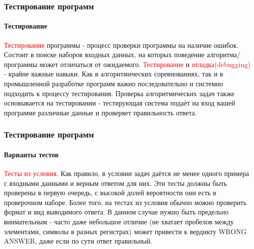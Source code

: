 \documentclass[aspectratio=169]{beamer}
\begin{document}
\begin{frame}
\frametitle{Тестирование программ}
\framesubtitle{Тестирование}
\justifying
\textcolor{red}{Тестирование} программы - процесс проверки программы на наличие ошибок. Состоит в поиске наборов входных данных, на которых поведение алгоритма/программы может отличаться от ожидаемого. \textcolor{red}{Тестирование} и \textcolor{red}{отладка(debugging)} - крайне важные навыки.\newline\newline
Как в алгоритмических соревнованиях, так и в промышленной разработке программ важно последовательно и системно подходить к процессу тестирования.\newline\newline
Проверка алгоритмических задач также основывается на тестировании - тестирующая система подаёт на вход вашей программе различные данные и проверяет правильность ответа.

\end{frame}

\begin{frame}
\frametitle{Тестирование программ}
\framesubtitle{Варианты тестов}
\justifying
\textcolor{red}{Тесты из условия}. Как правило, в условии задач даётся не менее одного примера с входными данными и верным ответом для них. Эти тесты должны быть проверены в первую очередь, с высокой долей вероятности они есть в проверочном наборе. \newline\newline
Более того, на тестах из условия обычно можно проверить формат и вид выводимого ответа. В данном случае нужно быть предельно внимательным - часто даже небольшое отличие (не хватает пробелов между элементами, символы в разных регистрах) может привести к вердикту WRONG ANSWER, даже если по сути ответ правильный.
\begin{figure}
    \captionsetup[subfigure]{labelformat=empty}
    \centering
\end{figure}
\end{frame}
\end{document}

